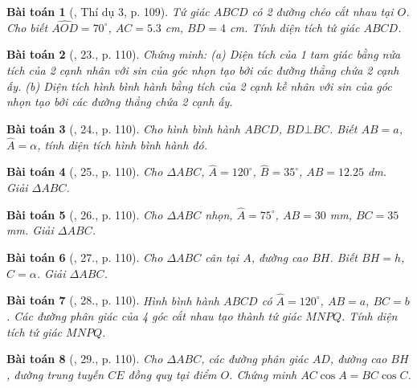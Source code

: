 \documentclass{article}
\newtheorem{baitoan}{Bài toán}
\begin{document}
\begin{baitoan}[\cite{Tuyen_Toan_9}, Thí dụ 3, p. 109]
	Tứ giác $ABCD$ có 2 đường chéo cắt nhau tại $O$. Cho biết $\widehat{AOD} = 70^\circ$, $AC = 5.3$ {\rm cm}, $BD = 4$ {\rm cm}. Tính diện tích tứ giác $ABCD$.
\end{baitoan}

\begin{baitoan}[\cite{Tuyen_Toan_9}, 23., p. 110]
	Chứng minh: (a) Diện tích của 1 tam giác bằng nửa tích của 2 cạnh nhân với sin của góc nhọn tạo bởi các đường thẳng chứa 2 cạnh ấy. (b) Diện tích hình bình hành bằng tích của 2 cạnh kề nhân với sin của góc nhọn tạo bởi các đường thẳng chứa 2 cạnh ấy.
\end{baitoan}

\begin{baitoan}[\cite{Tuyen_Toan_9}, 24., p. 110]
	Cho hình bình hành $ABCD$, $BD\bot BC$. Biết $AB = a$, $\widehat{A} = \alpha$, tính diện tích hình bình hành đó.
\end{baitoan}

\begin{baitoan}[\cite{Tuyen_Toan_9}, 25., p. 110]
	Cho $\Delta ABC$, $\widehat{A} = 120^\circ$, $\widehat{B} = 35^\circ$, $AB = 12.25$ {\rm dm}. Giải $\Delta ABC$.
\end{baitoan}

\begin{baitoan}[\cite{Tuyen_Toan_9}, 26., p. 110]
	Cho $\Delta ABC$ nhọn, $\widehat{A} = 75^\circ$, $AB = 30$ {\rm mm}, $BC = 35$ {\rm mm}. Giải $\Delta ABC$.
\end{baitoan}

\begin{baitoan}[\cite{Tuyen_Toan_9}, 27., p. 110]
	Cho $\Delta ABC$ cân tại $A$, đường cao $BH$. Biết $BH = h$, $\widehat{C} = \alpha$. Giải $\Delta ABC$.
\end{baitoan}

\begin{baitoan}[\cite{Tuyen_Toan_9}, 28., p. 110]
	Hình bình hành $ABCD$ có $\widehat{A} = 120^\circ$, $AB = a$, $BC = b$. Các đường phân giác của 4 góc cắt nhau tạo thành tứ giác $MNPQ$. Tính diện tích tứ giác $MNPQ$.
\end{baitoan}

\begin{baitoan}[\cite{Tuyen_Toan_9}, 29., p. 110]
	Cho $\Delta ABC$, các đường phân giác $AD$, đường cao $BH$, đường trung tuyến $CE$ đồng quy tại điểm $O$. Chứng minh $AC\cos A = BC\cos C$.
\end{baitoan}
\end{document}
